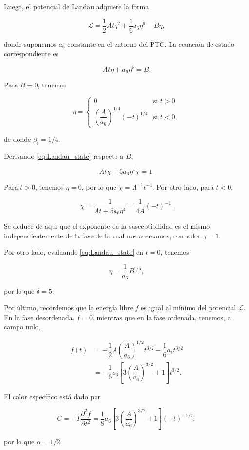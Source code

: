 \documentclass[10pt]{article}
\begin{document}
Luego, el potencial de Landau adquiere la forma

\begin{equation}
\mathcal{L} = \dfrac{1}{2} A t \eta^2 + \dfrac{1}{6} a_6 \eta^6 - B \eta,
\end{equation}

donde suponemos $a_6$ constante en el entorno del PTC. La ecuaci\'on de estado correspondiente es 

\begin{equation}\label{eq:Landau_state}
At\eta + a_6\eta^5 = B.
\end{equation}

Para $B=0$, tenemos

\[ \eta = \begin{cases} 
      0 & \text{si } t>	 0 \\
      \left(\dfrac{A}{a_6}\right)^{1/4} (-t)^{1/4} &\text{si } t< 0,
   \end{cases}
\]

de donde $\beta_t = 1/4$.

Derivando \ref{eq:Landau_state} respecto a $B$,

\begin{equation}
A t \chi + 5 a_6 \eta^4 \chi = 1.
\end{equation}

Para $t>0$, tenemos $\eta = 0$, por lo que $\chi = A^{-1} t^{-1}$. Por otro lado, para $t<0$,

\begin{equation}
\chi = \dfrac{1}{At + 5a_6\eta^4} = \dfrac{1}{4A} (-t)^{-1}.
\end{equation}

Se deduce de aqu\'i que el exponente de la susceptibilidad es el mismo independientemente de la fase de la cual nos acercamos, con valor $\gamma = 1$.

Por otro lado, evaluando \ref{eq:Landau_state} en $t = 0$, tenemos

\begin{equation}
\eta = \dfrac{1}{a_6} B^{1/5},
\end{equation}

por lo que $\delta = 5$.

Por \'ultimo, recordemos que la energ\'ia libre $f$ es igual al m\'inimo del potencial $\mathcal{L}$. En la fase desordenada, $f = 0$, mientras que en la fase ordenada, tenemos, a campo nulo,

\begin{align}
f(t) &= -\dfrac{1}{2} A \left( \dfrac{A}{a_6}\right)^{1/2} t^{3/2} - \dfrac{1}{6} a_6 t^{3/2}\\
&= -\dfrac{1}{6}a_6\left[3 \left( \dfrac{A}{a_6}\right)^{3/2} + 1\right] t^{3/2}.
\end{align}

El calor espec\'ifico est\'a dado por

\begin{equation}
C = -T \dfrac{\partial^2 f}{\partial t^2} = \dfrac{1}{8} a_6\left[3 \left( \dfrac{A}{a_6}\right)^{3/2} + 1\right] (-t)^{-1/2},
\end{equation}

por lo que $\alpha = 1/2$.
\end{document}
